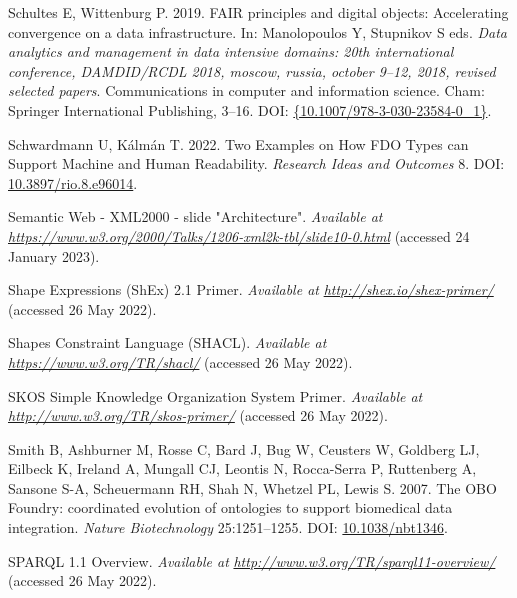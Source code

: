 \begin{CSLReferences}{1}{0}
\leavevmode{}%
Schultes E, Wittenburg P. 2019. FAIR principles and digital objects: Accelerating convergence on a data infrastructure. In: Manolopoulos Y, Stupnikov S eds. \emph{Data analytics and management in data intensive domains: 20th international conference, DAMDID/RCDL 2018, moscow, russia, october 9--12, 2018, revised selected papers}. Communications in computer and information science. Cham: Springer International Publishing, 3--16. DOI: \href{https://doi.org/\%7B10.1007/978-3-030-23584-0_1\%7D}{\{10.1007/978-3-030-23584-0\_1\}}.

\leavevmode{}%
Schwardmann U, Kálmán T. 2022. Two Examples on How FDO Types can Support Machine and Human Readability. \emph{Research Ideas and Outcomes} 8. DOI: \href{https://doi.org/10.3897/rio.8.e96014}{10.3897/rio.8.e96014}.

\leavevmode{}%
Semantic Web - XML2000 - slide "Architecture". \emph{Available at} \href{https://www.w3.org/2000/Talks/1206-xml2k-tbl/slide10-0.html}{\emph{https://www.w3.org/2000/Talks/1206-xml2k-tbl/slide10-0.html}} (accessed 24 January 2023).

\leavevmode{}%
Shape Expressions (ShEx) 2.1 Primer. \emph{Available at} \href{http://shex.io/shex-primer/}{\emph{http://shex.io/shex-primer/}} (accessed 26 May 2022).

\leavevmode{}%
Shapes Constraint Language (SHACL). \emph{Available at} \href{https://www.w3.org/TR/shacl/}{\emph{https://www.w3.org/TR/shacl/}} (accessed 26 May 2022).

\leavevmode{}%
SKOS Simple Knowledge Organization System Primer. \emph{Available at} \href{http://www.w3.org/TR/skos-primer/}{\emph{http://www.w3.org/TR/skos-primer/}} (accessed 26 May 2022).

\leavevmode{}%
Smith B, Ashburner M, Rosse C, Bard J, Bug W, Ceusters W, Goldberg LJ, Eilbeck K, Ireland A, Mungall CJ, Leontis N, Rocca-Serra P, Ruttenberg A, Sansone S-A, Scheuermann RH, Shah N, Whetzel PL, Lewis S. 2007. The OBO Foundry: coordinated evolution of ontologies to support biomedical data integration. \emph{Nature Biotechnology} 25:1251--1255. DOI: \href{https://doi.org/10.1038/nbt1346}{10.1038/nbt1346}.

\leavevmode{}%
SPARQL 1.1 Overview. \emph{Available at} \href{http://www.w3.org/TR/sparql11-overview/}{\emph{http://www.w3.org/TR/sparql11-overview/}} (accessed 26 May 2022).


\end{CSLReferences}
